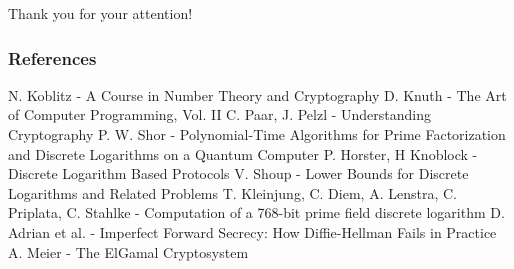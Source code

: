 \documentclass{beamer}
\begin{document}


\begin{frame}
\Huge{\centerline{Thank you for your attention!}}
\end{frame}



\begin{frame}
\frametitle{References}
\footnotesize{
\begin{thebibliography}{99} %

	N. Koblitz - A Course in Number Theory and Cryptography
	D. Knuth - The Art of Computer Programming, Vol. II
	C. Paar, J. Pelzl - Understanding Cryptography
	P. W. Shor - Polynomial-Time Algorithms for Prime Factorization and Discrete Logarithms on a Quantum Computer
	P. Horster, H Knoblock - Discrete Logarithm Based Protocols
	V. Shoup - Lower Bounds for Discrete Logarithms and Related Problems
	T. Kleinjung, C. Diem, A. Lenstra, C. Priplata, C. Stahlke - Computation of a 768-bit prime field discrete logarithm
	D. Adrian et al. - Imperfect Forward Secrecy: How Diffie-Hellman Fails in Practice
	A. Meier - The ElGamal Cryptosystem

\end{thebibliography}
}
\end{frame}
\end{document}
